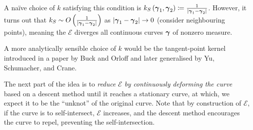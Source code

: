 \documentclass[../dissertation.tex]{subfiles}
\begin{document}
A na\"ive choice of $k$ satisfying this condition is $k_S \left( \boldsymbol{\gamma}_1, \boldsymbol{\gamma}_2 \right) \coloneqq \frac{1}{\lvert\boldsymbol{\gamma}_1 - \boldsymbol{\gamma}_2\lvert}$.
However, it turns out that $k_S \sim O\left( \frac{1}{\lvert\boldsymbol{\gamma}_1 - \boldsymbol{\gamma}_2\lvert} \right)$ as $\abs{\gammabf_1 - \gammabf_2} \rightarrow 0$ (consider neighbouring points), meaning the $\mathcal{E}$ diverges all continuous curves $\boldsymbol{\gamma}$ of nonzero measure.

A more analytically sensible choice of $k$ would be the tangent-point kernel introduced in a paper by Buck and Orloff\cite{BO1995} and later generalised by Yu, Schumacher, and Crane\cite{YSC2021}.

The next part of the idea is to \emph{reduce} $\mathcal{E}$ \emph{by continuously deforming the curve} based on a descent method until it reaches a stationary curve, at which, we expect it to be the ``unknot'' of the original curve.
Note that by construction of $\mathcal{E}$, if the curve is to self-intersect, $\mathcal{E}$ increases, and the descent method encourages the curve to repel, preventing the self-intersection.
\end{document}
